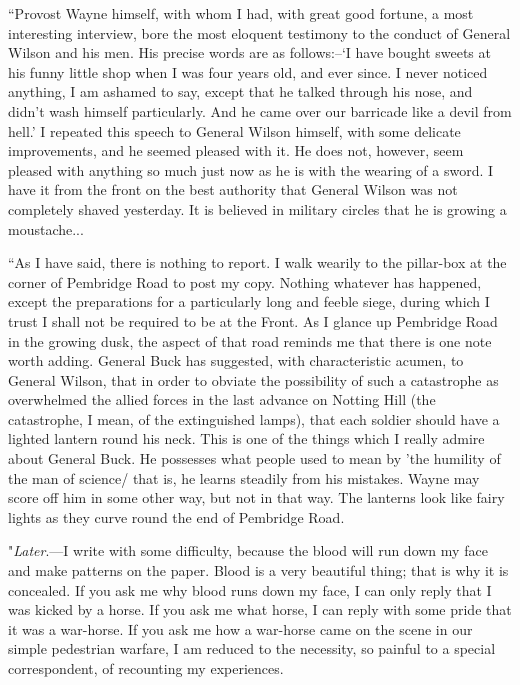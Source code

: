 \documentclass{book}
\begin{document}
“Provost Wayne himself, with whom I had, with great good fortune, a most interesting interview, bore the most eloquent testimony to the conduct of General Wilson and his men. His precise words are as follows:–‘I have bought sweets at his funny little shop when I was four years old, and ever since. I never noticed anything, I am ashamed to say, except that he talked through his nose, and didn’t wash himself particularly. And he came over our barricade like a devil from hell.’ I repeated this speech to General Wilson himself, with some delicate improvements, and he seemed pleased with it. He does not, however, seem pleased with anything so much just now as he is with the wearing of a sword. I have it from the front on the best authority that General Wilson was not completely shaved yesterday. It is believed in military circles that he is growing a moustache...

“As I have said, there is nothing to report. I walk wearily to the pillar-box at the corner of Pembridge Road to post my copy. Nothing whatever has happened, except the preparations for a particularly long and feeble siege, during which I trust I shall not be required to be at the Front. As I glance up Pembridge Road in the growing dusk, the aspect of that road reminds me that there is one note worth adding. General Buck has suggested, with characteristic acumen, to General Wilson, that in order to obviate the possibility of such a catastrophe as overwhelmed the allied forces in the last advance on Notting Hill (the catastrophe, I mean, of the extinguished lamps), that each soldier should have a lighted lantern round his neck. This is one of the things which I really admire about General Buck. He possesses what people used to mean by ’the humility of the man of science/ that is, he learns steadily from his mistakes. Wayne may score off him in some other way, but not in that way. The lanterns look like fairy lights as they curve round the end of Pembridge Road.

"\emph{Later}.—I write with some difficulty, because the blood will run down my face and make patterns on the paper. Blood is a very beautiful thing; that is why it is concealed. If you ask me why blood runs down my face, I can only reply that I was kicked by a horse. If you ask me what horse, I can reply with some pride that it was a war-horse. If you ask me how a war-horse came on the scene in our simple pedestrian warfare, I am reduced to the necessity, so painful to a special correspondent, of recounting my experiences.
\end{document}
